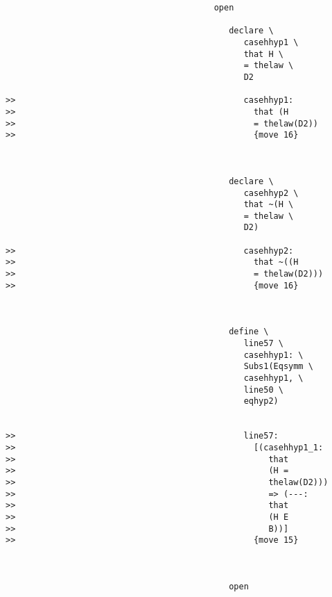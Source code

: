 \documentclass[12pt]{article}
\begin{document}
\begin{verbatim}
                                          open

                                             declare \
                                                casehhyp1 \
                                                that H \
                                                = thelaw \
                                                D2

>>                                              casehhyp1:
>>                                                that (H
>>                                                = thelaw(D2))
>>                                                {move 16}



                                             declare \
                                                casehhyp2 \
                                                that ~(H \
                                                = thelaw \
                                                D2)

>>                                              casehhyp2:
>>                                                that ~((H
>>                                                = thelaw(D2)))
>>                                                {move 16}



                                             define \
                                                line57 \
                                                casehhyp1: \
                                                Subs1(Eqsymm \
                                                casehhyp1, \
                                                line50 \
                                                eqhyp2)


>>                                              line57:
>>                                                [(casehhyp1_1:
>>                                                   that
>>                                                   (H =
>>                                                   thelaw(D2)))
>>                                                   => (---:
>>                                                   that
>>                                                   (H E
>>                                                   B))]
>>                                                {move 15}



                                             open


\end{verbatim}
\end{document}
